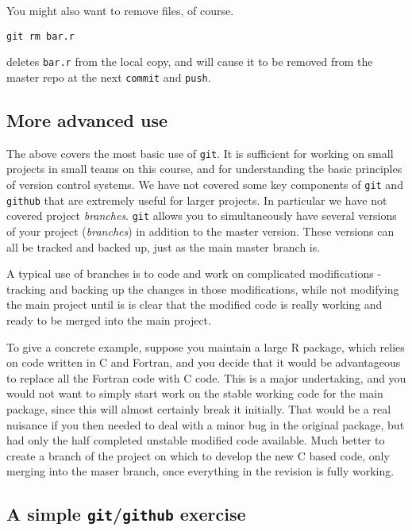 \documentclass[10pt] {article}
\theoremstyle{definition}
\begin{document}
You might also want to remove files, of course. 
\begin{verbatim}
git rm bar.r
\end{verbatim}
deletes {\tt bar.r} from the local copy, and will cause it to be removed from the master repo at the next {\tt commit} and {\tt push}.

\subsection{More advanced use}

The above covers the most basic use of {\tt git}. It is sufficient for working on small projects in small teams on this course, and for understanding the basic principles of version control systems. We have not covered some key components of  
{\tt git} and {\tt github} that are extremely useful for larger projects. In particular we have not covered project {\em branches}. {\tt git} allows you to simultaneously have several versions of your project ({\em  branches}) in addition to the master version. These versions can all be tracked and backed up, just as the main master branch is. 

A typical use of branches is to code and work on complicated modifications - tracking and backing up the changes in those modifications, while not modifying the main project until is is clear that the modified code is really working and ready to be merged into the main project. 

To give a concrete example, suppose you maintain a large R package, which relies on code written in C and Fortran, and you decide that it would be advantageous to replace all the Fortran code with C code. This is a major undertaking, and you would not want to simply start work on the stable working code for the main package, since this will almost certainly break it initially. That would be a real nuisance if you then needed to deal with a minor bug in the original package, but had only the half completed unstable modified code available. Much better to create a branch of the project on which to develop the new C based code, only merging into the maser branch, once everything in the revision is fully working.  

\subsection{A simple {\tt git}/{\tt github} exercise}
\end{document}
